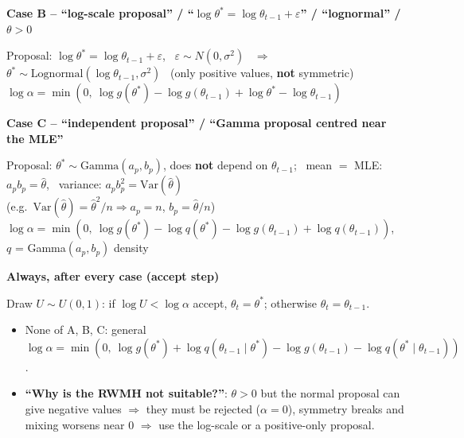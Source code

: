 \documentclass[10pt]{article}
\newcommand{\Q}[1]{\textbf{``#1''}}
\newenvironment{answer}[1][Answer to write]{\par\vspace{2pt}\begin{shaded}\small\textbf{#1}\par\vspace{1pt}}{\end{shaded}\vspace{-2pt}}
\begin{document}
\begin{answer}[Case B -- ``log-scale proposal'' / ``$\log\theta^*=\log\theta_{t-1}+\varepsilon$'' / ``lognormal'' / $\theta>0$]
Proposal: $\log\theta^*=\log\theta_{t-1}+\varepsilon$, \ $\varepsilon\sim N(0,\sigma^2)$ \ $\Rightarrow$ \ $\theta^*\sim\text{Lognormal}(\log\theta_{t-1},\sigma^2)$ \ (only positive values, \textbf{not} symmetric)\\
$\log\alpha=\min\left(0,\ \log g(\theta^*)-\log g(\theta_{t-1})+\log\theta^*-\log\theta_{t-1}\right)$\\
\end{answer}

\begin{answer}[Case C -- ``independent proposal'' / ``Gamma proposal centred near the MLE'']
Proposal: $\theta^*\sim\text{Gamma}(a_p,b_p)$, does \textbf{not} depend on $\theta_{t-1}$; \ mean $=$ MLE: $a_pb_p=\hat\theta$, \ variance: $a_pb_p^2=\mathrm{Var}(\hat\theta)$\\
\hspace*{1em}(e.g.\ $\mathrm{Var}(\hat\theta)=\hat\theta^2/n \Rightarrow a_p=n$, $b_p=\hat\theta/n$)\\
$\log\alpha=\min\left(0,\ \log g(\theta^*)-\log q(\theta^*)-\log g(\theta_{t-1})+\log q(\theta_{t-1})\right)$, \ $q$ = Gamma$(a_p,b_p)$ density
\end{answer}

\begin{answer}[Always, after every case (accept step)]
Draw $U\sim U(0,1)$: if $\log U<\log\alpha$ accept, $\theta_t=\theta^*$; otherwise $\theta_t=\theta_{t-1}$.
\end{answer}
\begin{itemize}
\item None of A, B, C: general $\log\alpha=\min\left(0,\ \log g(\theta^*)+\log q(\theta_{t-1}\mid\theta^*)-\log g(\theta_{t-1})-\log q(\theta^*\mid\theta_{t-1})\right)$.
\item \Q{Why is the RWMH not suitable?}: $\theta>0$ but the normal proposal can give negative values $\Rightarrow$ they must be rejected ($\alpha=0$), symmetry breaks and mixing worsens near 0 $\Rightarrow$ use the log-scale or a positive-only proposal.
\end{itemize}
\end{document}
